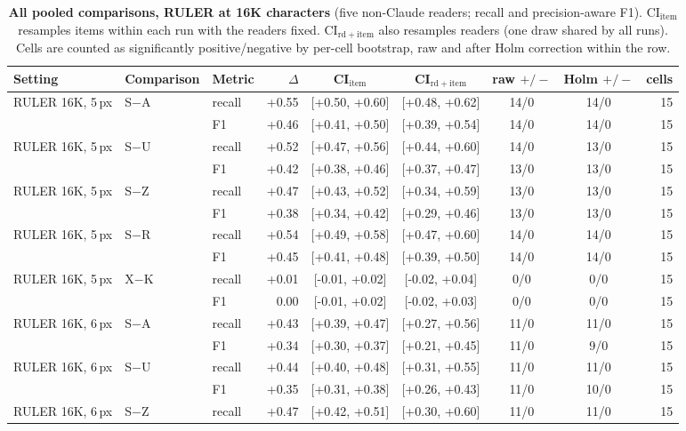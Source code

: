 \begin{table}[!htbp]
\centering
\caption{\textbf{All pooled comparisons, RULER at 16K characters} (five non-Claude readers; recall and precision-aware F1). CI$_{\mathrm{item}}$ resamples items within each run with the readers fixed. CI$_{\mathrm{rd+item}}$ also resamples readers (one draw shared by all runs). Cells are counted as significantly positive/negative by per-cell bootstrap, raw and after Holm correction within the row.}
\label{tab:app_pooled}
\footnotesize
\setlength{\tabcolsep}{3pt}
\begin{tabular}{l l l r c c c c r}
\toprule
Setting & Comparison & Metric & $\Delta$ & CI$_{\mathrm{item}}$ & CI$_{\mathrm{rd+item}}$ & raw $+/-$ & Holm $+/-$ & cells \\
\midrule
RULER 16K, 5\,px & S$-$A & recall & +0.55 & [+0.50, +0.60] & [+0.48, +0.62] & 14/0 & 14/0 & 15 \\
 &  & F1 & +0.46 & [+0.41, +0.50] & [+0.39, +0.54] & 14/0 & 14/0 & 15 \\
RULER 16K, 5\,px & S$-$U & recall & +0.52 & [+0.47, +0.56] & [+0.44, +0.60] & 14/0 & 13/0 & 15 \\
 &  & F1 & +0.42 & [+0.38, +0.46] & [+0.37, +0.47] & 13/0 & 13/0 & 15 \\
RULER 16K, 5\,px & S$-$Z & recall & +0.47 & [+0.43, +0.52] & [+0.34, +0.59] & 13/0 & 13/0 & 15 \\
 &  & F1 & +0.38 & [+0.34, +0.42] & [+0.29, +0.46] & 13/0 & 13/0 & 15 \\
RULER 16K, 5\,px & S$-$R & recall & +0.54 & [+0.49, +0.58] & [+0.47, +0.60] & 14/0 & 14/0 & 15 \\
 &  & F1 & +0.45 & [+0.41, +0.48] & [+0.39, +0.50] & 14/0 & 14/0 & 15 \\
RULER 16K, 5\,px & X$-$K & recall & +0.01 & [-0.01, +0.02] & [-0.02, +0.04] & 0/0 & 0/0 & 15 \\
 &  & F1 & 0.00 & [-0.01, +0.02] & [-0.02, +0.03] & 0/0 & 0/0 & 15 \\
RULER 16K, 6\,px & S$-$A & recall & +0.43 & [+0.39, +0.47] & [+0.27, +0.56] & 11/0 & 11/0 & 15 \\
 &  & F1 & +0.34 & [+0.30, +0.37] & [+0.21, +0.45] & 11/0 & 9/0 & 15 \\
RULER 16K, 6\,px & S$-$U & recall & +0.44 & [+0.40, +0.48] & [+0.31, +0.55] & 11/0 & 11/0 & 15 \\
 &  & F1 & +0.35 & [+0.31, +0.38] & [+0.26, +0.43] & 11/0 & 10/0 & 15 \\
RULER 16K, 6\,px & S$-$Z & recall & +0.47 & [+0.42, +0.51] & [+0.30, +0.60] & 11/0 & 11/0 & 15 \\

\end{tabular}
\end{table}
